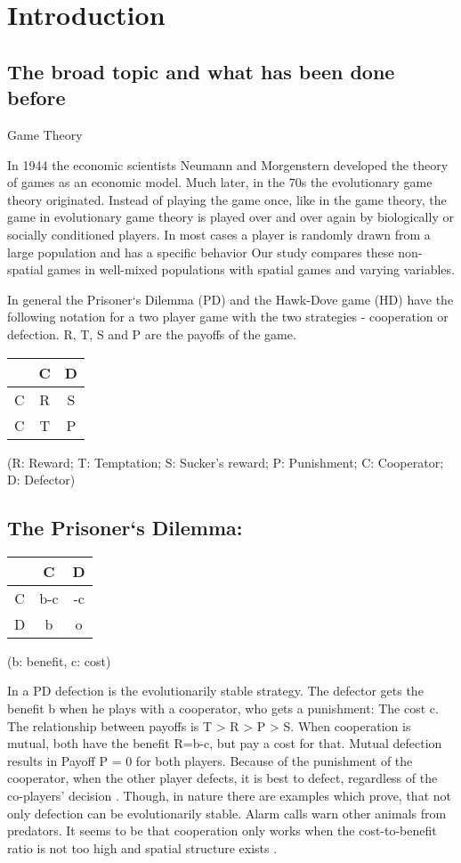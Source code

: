 \section{Introduction}

\subsection{The broad topic and what has been done before}

Game Theory

In 1944 the economic scientists Neumann and Morgenstern developed the theory of games as an economic model. Much later, in the 70s the evolutionary game theory originated. Instead of playing the game once, like in the game theory, the game in evolutionary game theory is played over and over again by biologically or socially conditioned players. In most cases a player is randomly drawn from a large population and has a specific behavior \citep{weibull1997} Our study compares these non-spatial games in well-mixed populations with spatial games and varying variables.

In general the Prisoner`s Dilemma (PD) and the Hawk-Dove game (HD) have the following notation for a two player game with the two strategies - cooperation or defection. R, T, S and P are the payoffs of the game.

\begin{tabular}{|c|c|c|}
		\hline  & C & D \\ 
		\hline C & R & S \\ 
		\hline C & T & P \\ 
		\hline 
\end{tabular} 
(R: Reward; T: Temptation; S: Sucker's reward; P: Punishment; C: Cooperator; D: Defector)


\subsection{The Prisoner`s Dilemma:}

\begin{tabular}{|c|c|c|}
	\hline  & C & D \\ 
	\hline C & b-c & -c \\ 
	\hline D & b & o \\ 
	\hline 
\end{tabular} 
(b: benefit, c: cost)

In a PD defection is the evolutionarily stable strategy. The defector gets the benefit b when he plays with a cooperator, who gets a punishment: The cost c. The relationship between payoffs is T > R > P > S. When cooperation is mutual, both have the benefit R=b-c, but pay a cost for that. Mutual defection results in Payoff P = 0 for both players. Because of the punishment of the cooperator, when the other player defects, it is best to defect, regardless of the co-players' decision \citep{HauertandDoebeli2004}. Though, in nature there are examples which prove, that not only defection can be evolutionarily stable. Alarm calls warn other animals from predators. It seems to be that cooperation only works when the cost-to-benefit ratio is not too high and spatial structure exists \citep{clutton1999}.

